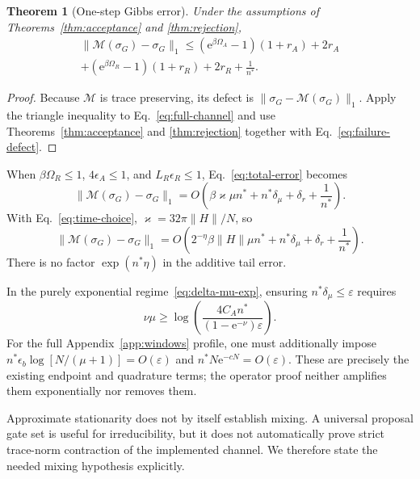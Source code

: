 \documentclass[aps,floatfix,10pt,amssymb,amsmath,superscriptaddress,nofootinbib,longbibliography,nobalancelastpage,twocolumn]{revtex4-2}
\newtheorem{theorem}{Theorem}
\newcommand{\cM}{\mathcal{M}}
\newcommand{\e}{\mathrm{e}}
\begin{document}
\begin{theorem}[One-step Gibbs error]
\label{thm:one-step}
Under the assumptions of Theorems~\ref{thm:acceptance} and \ref{thm:rejection},
\begin{multline}
 \|\cM(\sigma_G)-\sigma_G\|_1\leq
 (\e^{\beta\Omega_A}-1)(1+r_A)+2r_A\\
 +(\e^{\beta\Omega_R}-1)(1+r_R)+2r_R+\frac1{n^*}.
 \label{eq:total-error}
\end{multline}
\end{theorem}
\begin{proof}
Because $\cM$ is trace preserving, its defect is
$\|\sigma_G-\cM(\sigma_G)\|_1$.  Apply the triangle inequality to Eq.~\eqref{eq:full-channel} and use Theorems~\ref{thm:acceptance} and \ref{thm:rejection} together with Eq.~\eqref{eq:failure-defect}.
\end{proof}

When $\beta\Omega_R\leq1$, $4\epsilon_A\leq1$, and $L_R\epsilon_R\leq1$, Eq.~\eqref{eq:total-error} becomes
\begin{equation}
 \|\cM(\sigma_G)-\sigma_G\|_1
 =O\!\left(\beta\varkappa\mu n^*
 +n^*\delta_\mu+\delta_r+\frac1{n^*}\right).
 \label{eq:small-error}
\end{equation}
With Eq.~\eqref{eq:time-choice}, $\varkappa=32\pi\|H\|/N$, so
\begin{equation}
 \|\cM(\sigma_G)-\sigma_G\|_1
 =O\!\left(2^{-\eta}\beta\|H\|\mu n^*
 +n^*\delta_\mu+\delta_r+\frac1{n^*}\right).
 \label{eq:main-scaling}
\end{equation}
There is no factor $\exp(n^*\eta)$ in the additive tail error.

In the purely exponential regime~\eqref{eq:delta-mu-exp}, ensuring $n^*\delta_\mu\leq\varepsilon$ requires
\begin{equation}
 \nu\mu\geq
 \log\!\left(\frac{4C_An^*}{(1-\e^{-\nu})\varepsilon}\right).
 \label{eq:mu-choice}
\end{equation}
For the full Appendix~\ref{app:windows} profile, one must additionally impose
$n^*\epsilon_b\log[N/(\mu+1)]=O(\varepsilon)$ and
$n^*N\e^{-cN}=O(\varepsilon)$.  These are precisely the existing endpoint and quadrature terms; the operator proof neither amplifies them exponentially nor removes them.

Approximate stationarity does not by itself establish mixing.  A universal proposal gate set is useful for irreducibility, but it does not automatically prove strict trace-norm contraction of the implemented channel.  We therefore state the needed mixing hypothesis explicitly.
\end{document}
